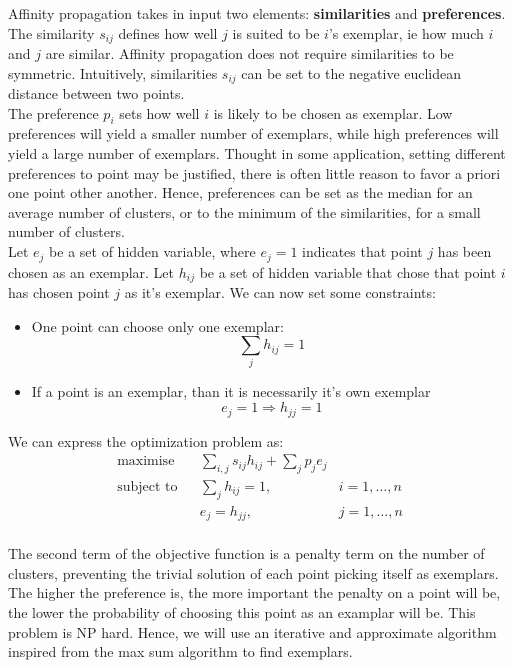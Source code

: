 \documentclass{ipol}
\begin{document}
Affinity propagation takes in input two elements: \textbf{similarities} and
\textbf{preferences}. The similarity $s_{ij}$ defines how well $j$ is suited
to be $i$'s exemplar, ie how much $i$ and $j$ are similar. Affinity
propagation does not require similarities to be symmetric. Intuitively,
similarities $s_{ij}$ can be set to the negative euclidean distance between
two points. \\

The preference $p_i$ sets how well $i$ is likely to be chosen as exemplar. Low
preferences will yield a smaller number of exemplars, while high preferences
will yield a large number of exemplars. Thought in some application, setting
different preferences to point may be justified, there is often little reason
to favor a priori one point other another. Hence, preferences can be set as
the median for an average number of clusters, or to the minimum of the
similarities, for a small number of clusters. \\

Let $e_j$ be a set of hidden variable, where $e_j = 1$ indicates that point
$j$ has been chosen as an exemplar. Let $h_{ij}$ be a set of hidden variable
that chose that point $i$ has chosen point $j$ as it's exemplar. We can now
set some constraints:
\begin{itemize}
\item One point can choose only one exemplar:
\begin{equation*}
\sum_{j} h_{ij} = 1
\end{equation*}
\item If a point is an exemplar, than it is necessarily it's own exemplar
\begin{equation*}
e_{j} = 1 \Rightarrow h_{jj} = 1
\end{equation*}
\end{itemize}

We can express the optimization problem as:
\begin{equation*}
\renewcommand{\arraystretch}{2}
\begin{array}{ccll}
\text{maximise} & & \sum_{i, j} s_{ij} h_{ij} + \sum_{j} p_j e_j & \\
\text{subject to} &  & \sum_{j} h_{ij} = 1, & i = 1, \dots, n \\
		  &  & e_{j} = h_{jj}, & j = 1, \dots, n\\
\end{array}
\end{equation*}


The second term of the objective function is a penalty term on the number of clusters, preventing the
trivial solution of each point picking itself as exemplars. The higher the
preference is, the more important the penalty on a point will be, the lower
the probability of choosing this point as an examplar will be. This problem is
NP hard. Hence, we will use an iterative and approximate algorithm inspired
from the max sum algorithm to find exemplars. \\
\end{document}
